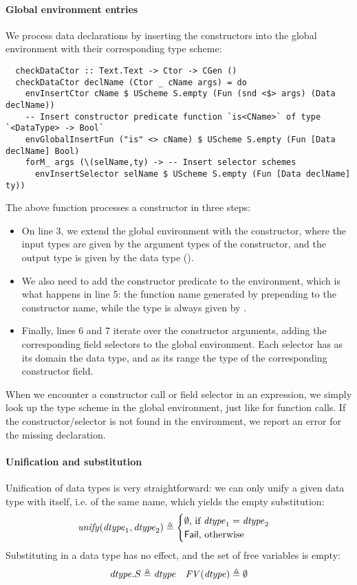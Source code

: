 \paragraph{Global environment entries}
We process data declarations by inserting the constructors into the global
environment with their corresponding type scheme:
\begin{verbatim}
  checkDataCtor :: Text.Text -> Ctor -> CGen ()
  checkDataCtor declName (Ctor _ cName args) = do
    envInsertCtor cName $ UScheme S.empty (Fun (snd <$> args) (Data declName))
    -- Insert constructor predicate function `is<CName>` of type `<DataType> -> Bool`
    envGlobalInsertFun ("is" <> cName) $ UScheme S.empty (Fun [Data declName] Bool)
    forM_ args (\(selName,ty) -> -- Insert selector schemes
      envInsertSelector selName $ UScheme S.empty (Fun [Data declName] ty))
\end{verbatim}
%
The above function processes a constructor  in three steps:
\begin{itemize}
  \item On line 3, we extend the global environment with the constructor, where
        the input types are given by the argument types of the constructor, and
        the output type is given by the data type ().
  \item We also need to add the constructor predicate to the environment, which
        is what happens in line 5: the function name generated by prepending
         to the constructor name, while the type is always given
        by .
  \item Finally, lines 6 and 7 iterate over the constructor arguments, adding
        the corresponding field selectors to the global environment. Each
        selector has as its domain the data type, and as its range the type of
        the corresponding constructor field.
\end{itemize}

When we encounter a constructor call or field selector in an expression, we
simply look up the type scheme in the global environment, just like for function
calls. If the constructor/selector is not found in the environment, we report an
error for the missing declaration.

\paragraph{Unification and substitution}
Unification of data types is very straightforward: we can only unify a given
data type with itself, i.e. of the same name, which yields the empty substitution:
\[ \mathit{unify}(\mathit{dtype}_1, \mathit{dtype}_2) \triangleq
    \begin{cases}
      \emptyset \text{, if } \mathit{dtype}_1 = \mathit{dtype}_2 \\
      \mathsf{Fail} \text{, otherwise}
    \end{cases} \]
%
Substituting in a data type has no effect, and the set of free variables is empty:
\begin{align*}
  \mathit{dtype}.S \triangleq \mathit{dtype} && \mathit{FV}(\mathit{dtype}) \triangleq \emptyset
\end{align*}


